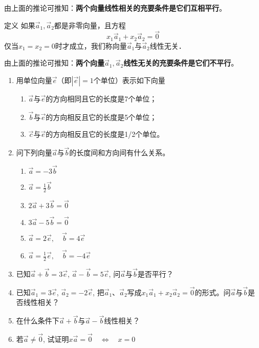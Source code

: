 由上面的推论可推知：\textbf{两个向量线性相关的充要条件是它们互相平行}。

\begin{blk}
    {定义} 如果$\vec{a}_1,\vec{a}_2$都是非零向量，且方程
    \[x_1\vec{a}_1+x_2\vec{a}_2=\vec{0}\]
仅当$x_1=x_2=0$时才成立，我们称向量$\vec{a}_1$与$\vec{a}_2$线性无关．
\end{blk}

由上面的推论可推知：\textbf{两个向量$\vec{a}_1,\vec{a}_2$线性无关的充要条件是它们不平行}。

\begin{ex}
\begin{enumerate}
    \item 用单位向量$\vec{e}$（即$|\vec{e}|=1$个单位）表示如下向量
\begin{enumerate}
    \item $\vec{a}$与$\vec{e}$的方向相同且它的长度是7个单位；
    \item $\vec{b}$与$\vec{e}$的方向相反且它的长度是5个单位；
    \item $\vec{c}$与$\vec{e}$的方向相反且它的长度是1/2个单位。
\end{enumerate} 
\item 问下列向量$\vec{a}$与$\vec{b}$的长度间和方向间有什么关系。
\begin{multicols}{2}
\begin{enumerate}
    \item $\vec{a}=-3\vec{b}$
    \item $\vec{a}=\frac{1}{2}\vec{b}$
    \item $2\vec{a}+3\vec{b}=\vec{0}$
    \item $3\vec{a}-5\vec{b}=\vec{0}$
    \item $\vec{a}=2\vec{e},\quad \vec{b}=4\vec{e}$
    \item $\vec{a}=\frac{1}{2}\vec{e},\quad \vec{b}=-4\vec{e}$
\end{enumerate}
\end{multicols}
\item 已知$\vec{a}+\vec{b}=3\vec{e}$, $\vec{a}-\vec{b}=5\vec{e}$, 问$\vec{a}$与$\vec{b}$是否平行？
\item 已知$\vec{a}_1=3\vec{e}$, $\vec{a}_2=-2\vec{e}$, 把$\vec{a}_1$、$\vec{a}_2$写成$x_1\vec{a}_1+x_2\vec{a}_2=\vec{0}$的形式。问$\vec{a}$与$\vec{b}$是否线性相关？
\item 在什么条件下$\vec{a}+\vec{b}$与$\vec{a}-\vec{b}$线性相关？
\item 若$\vec{a}\ne \vec{0}$, 试证明$x\vec{a}=\vec{0}\quad \Leftrightarrow\quad x=0$
\end{enumerate}  
\end{ex}

